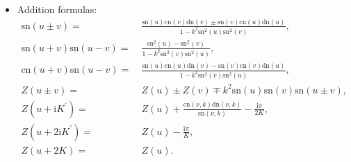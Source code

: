 \documentclass[11pt,reqno]{amsart}
\newcommand{\ii}{\mathrm{i}}
\newcommand{\sn}{\mathrm{sn}}
\newcommand{\cn}{\mathrm{cn}}
\newcommand{\dn}{\mathrm{dn}}
\numberwithin{equation}{section}
\begin{document}
\begin{itemize}
\begin{equation}
		\dn(2u)=\frac{\dn^2(u)-k^2\sn^2(u)\cn^2(u)}{1-k^2\sn^4(u)};
	\end{equation}
	\item Addition formulas:
	\begin{equation}\label{eq:add-app}
		\begin{split}
			\sn( u \pm  v)= &\ \frac{\sn(u)\cn(v)\dn(v)\pm \sn(v)\cn(u)\dn(u)}{1-k^2\sn^2(u)\sn^2(v)},\\
			\sn(u+v)\sn(u-v)=&\ \frac{\sn^2(u)-\sn^2(v)}{1-k^2\sn^2(v)\sn^2(u)},\\
			\cn(u+v)\sn(u-v)=&\ \frac{\sn(u)\cn(u)\dn(v)-\sn(v)\cn(v)\dn(u)}{1-k^2\sn^2(v)\sn^2(u)},\\
			Z(u\pm v)=&\ Z(u)\pm Z(v) \mp k^2 \sn(u)\sn(v)\sn(u\pm v),\\
			Z(u+ \ii K^{\prime})=&\ Z(u)+\frac{\cn(\nu,k)\dn(\nu,k)}{\sn(\nu,k)}-\frac{\ii\pi}{2K},\\
			Z(u+ 2\ii K^{\prime})=&\ Z(u)-\frac{\ii\pi}{K},\\
			Z(u+2K)=&\ Z(u).
		\end{split}
	\end{equation}
	
\end{itemize}
\end{document}
